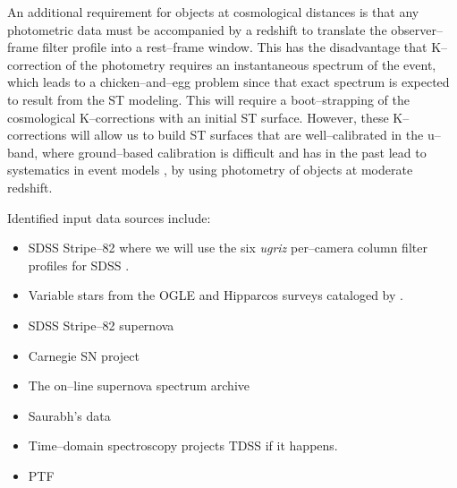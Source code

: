 An additional requirement for objects at cosmological distances is that any
photometric data must be accompanied by a redshift to translate the
observer--frame filter profile into a rest--frame window. This has the
disadvantage that K--correction of the photometry \citep{2002astro.ph.10394H}
requires an instantaneous spectrum of the event, which leads to a
chicken--and--egg problem since that exact spectrum is expected to result from
the ST modeling.  This will require a boot--strapping of the cosmological
K--corrections with an initial ST surface.  However, these K--corrections will
allow us to build ST surfaces that are well--calibrated in the u--band, where
ground--based calibration is difficult and has in the past lead to systematics
in event models \citep{2009ApJS..185...32K}, by using photometry of objects at
moderate redshift.

Identified input data sources include:

\begin{itemize}


\item SDSS Stripe--82 where we will use the six {\it ugriz} per--camera column
filter profiles for SDSS \citep{2007AJ....134..973I}.

\item Variable stars from the OGLE and Hipparcos surveys cataloged by
\cite{2007A&A...475.1159D}.


\item SDSS Stripe--82 supernova

\item Carnegie SN project

\item The on--line supernova spectrum archive

\item Saurabh's data

\item Time--domain spectroscopy projects TDSS if it happens.


\item PTF

\end{itemize}


\smallskip

